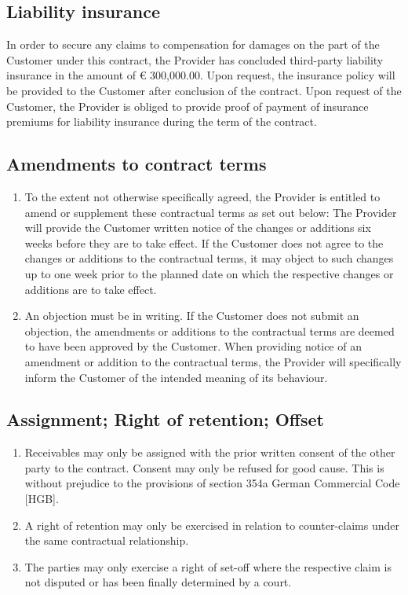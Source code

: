 \documentclass{terms}
\begin{document}
\subsection{Liability insurance}
In order to secure any claims to compensation for damages on the part of the Customer under this contract, the Provider has concluded third-party liability insurance in the amount of € 300,000.00.
Upon request, the insurance policy will be provided to the Customer after conclusion of the contract.
Upon request of the Customer, the Provider is obliged to provide proof of payment of insurance premiums for liability insurance during the term of the contract.

\subsection{Amendments to contract terms}
\begin{enumerate}
\item To the extent not otherwise specifically agreed, the Provider is entitled to amend or supplement these contractual terms as set out below: The Provider will provide the Customer written notice of the changes or additions six weeks before they are to take effect.
      If the Customer does not agree to the changes or additions to the contractual terms, it may object to such changes up to one week prior to the planned date on which the respective changes or additions are to take effect.
\item An objection must be in writing.
      If the Customer does not submit an objection, the amendments or additions to the contractual terms are deemed to have been approved by the Customer.
      When providing notice of an amendment or addition to the contractual terms, the Provider will specifically inform the Customer of the intended meaning of its behaviour.
\end{enumerate}

\subsection{Assignment; Right of retention; Offset}
\begin{enumerate}
\item Receivables may only be assigned with the prior written consent of the other party to the contract.
      Consent may only be refused for good cause.
      This is without prejudice to the provisions of section 354a German Commercial Code [HGB].
\item A right of retention may only be exercised in relation to counter-claims under the same contractual relationship.
\item The parties may only exercise a right of set-off where the respective claim is not disputed or has been finally determined by a court.
\end{enumerate}
\end{document}
